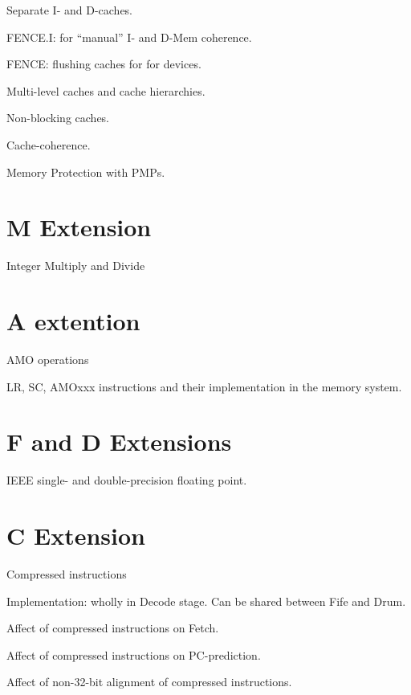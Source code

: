 Separate I- and D-caches.

FENCE.I: for ``manual'' I- and D-Mem coherence.

FENCE: flushing caches for for devices.

Multi-level caches and cache hierarchies.

Non-blocking caches.

Cache-coherence.

Memory Protection with PMPs.


\section{M Extension}

Integer Multiply and Divide


\section{A extention}

AMO operations

LR, SC, AMOxxx instructions and their implementation in the memory system.


\section{F and D Extensions}

IEEE single- and double-precision floating point.


\section{C Extension}

Compressed instructions

Implementation: wholly in Decode stage.  Can be shared between Fife and Drum.

Affect of compressed instructions on Fetch.

Affect of compressed instructions on PC-prediction.

Affect of non-32-bit alignment of compressed instructions.

